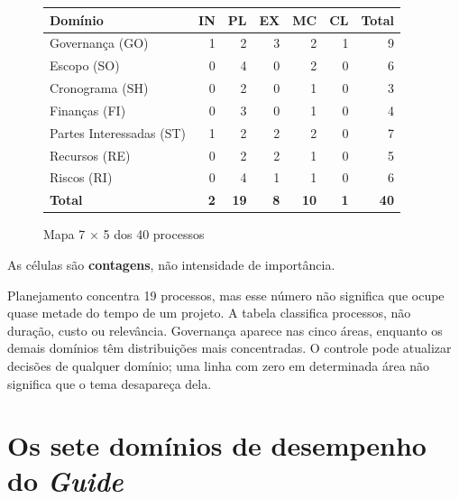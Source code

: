 \documentclass[11pt,a4paper]{article}
\makeatletter
\newcommand{\refnum}[1]{\csname refnum@#1\endcsname}
\newcommand{\SingleSpacing}{}
\newcommand{\fontetab}[1]{\par\vspace{3pt}{\small\noindent Fonte: #1\par}}
\makeatother
\begin{document}
\begin{figure}[!htbp]
\centering

\begingroup\SingleSpacing\small
\begin{tabular}{@{}lrrrrrr@{}}
\midrule
\textbf{Domínio} & \textbf{IN} & \textbf{PL} & \textbf{EX} & \textbf{MC} & \textbf{CL} & \textbf{Total}\\
\midrule
Governança (GO) & \cellcolor{exLine!11}1 & \cellcolor{exLine!22}2 & \cellcolor{exLine!33}3 & \cellcolor{exLine!22}2 & \cellcolor{exLine!11}1 & 9\\
Escopo (SO) & 0 & \cellcolor{exLine!44}4 & 0 & \cellcolor{exLine!22}2 & 0 & 6\\
Cronograma (SH) & 0 & \cellcolor{exLine!22}2 & 0 & \cellcolor{exLine!11}1 & 0 & 3\\
Finanças (FI) & 0 & \cellcolor{exLine!33}3 & 0 & \cellcolor{exLine!11}1 & 0 & 4\\
Partes Interessadas (ST) & \cellcolor{exLine!11}1 & \cellcolor{exLine!22}2 & \cellcolor{exLine!22}2 & \cellcolor{exLine!22}2 & 0 & 7\\
Recursos (RE) & 0 & \cellcolor{exLine!22}2 & \cellcolor{exLine!22}2 & \cellcolor{exLine!11}1 & 0 & 5\\
Riscos (RI) & 0 & \cellcolor{exLine!44}4 & \cellcolor{exLine!11}1 & \cellcolor{exLine!11}1 & 0 & 6\\
\midrule
\textbf{Total} & \textbf{2} & \textbf{19} & \textbf{8} & \textbf{10} & \textbf{1} & \textbf{40}\\
\midrule
\end{tabular}
\endgroup
\fontetab{[\refnum{pmi}, Guide, Tabela 2-1 e figuras de visão geral dos domínios]; cálculo e apresentação próprios.}
\caption{Mapa 7 \ensuremath{\times} 5 dos 40 processos}\label{fig:2}
\end{figure}

As células são \textbf{contagens}, não intensidade de importância.

Planejamento concentra 19 processos, mas esse número não significa que ocupe quase metade do tempo de um projeto. A tabela classifica processos, não duração, custo ou relevância. Governança aparece nas cinco áreas, enquanto os demais domínios têm distribuições mais concentradas. O controle pode atualizar decisões de qualquer domínio; uma linha com zero em determinada área não significa que o tema desapareça dela.

\section{Os sete domínios de desempenho do \textit{Guide}}
\end{document}
